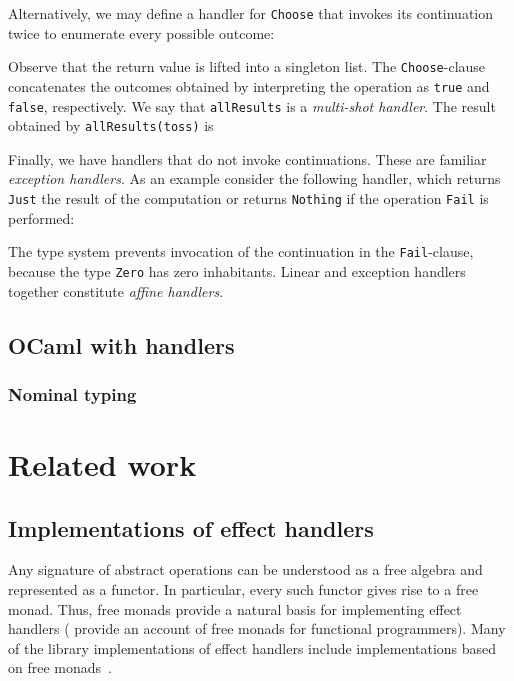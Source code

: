 \documentclass[mscres,cdtppar,twoside,openright,logo,rightchapter,normalheadings]{infthesis}
\theoremstyle{definition}
\begin{document}
Alternatively, we may define a handler for \lstinline$Choose$ that
invokes its continuation twice to enumerate every possible outcome:
%

%
Observe that the return value is lifted into a singleton list. The
\lstinline$Choose$-clause concatenates the outcomes obtained by
interpreting the operation as \lstinline$true$ and \lstinline$false$,
respectively. We say that \lstinline$allResults$ is a \emph{multi-shot
  handler}. The result obtained by \lstinline$allResults(toss)$ is
%

%

Finally, we have handlers that do not invoke continuations. These are
familiar \emph{exception handlers}. As an example consider the
following handler, which returns \lstinline$Just$ the result of the
computation or returns \lstinline$Nothing$ if the operation
\lstinline$Fail$ is performed:
%

%
The type system prevents invocation of the continuation in the
\lstinline$Fail$-clause, because the type \lstinline$Zero$ has zero
inhabitants. Linear and exception handlers together constitute
\emph{affine handlers}.

\section{OCaml with handlers}
\label{sec:ocaml-handlers}

\subsection{Nominal typing}

\chapter{Related work}
\label{ch:related-work}

\section{Implementations of effect handlers}
Any signature of abstract operations can be understood as a free
algebra and represented as a functor. In particular, every such
functor gives rise to a free monad. Thus, free monads provide a
natural basis for implementing effect handlers (\citet{Swierstra2008b}
provide an account of free monads for functional programmers).  Many
of the library implementations of effect handlers include
implementations based on free monads~\citep{Kammar2013, Kiselyov2013,
  Kiselyov2015, Brady2013, Wu2014}.
\end{document}
